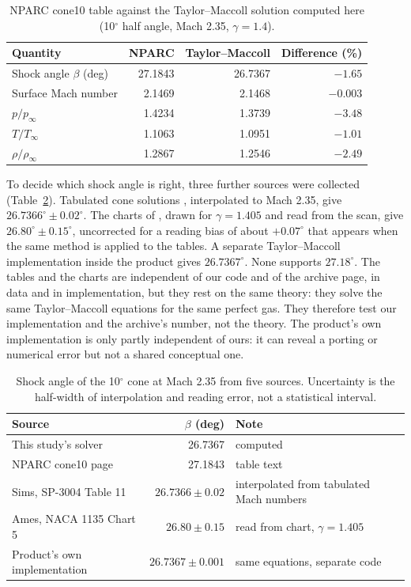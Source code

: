\documentclass[11pt,a4paper]{article}
\newcommand{\pinf}{p_\infty}
\begin{document}
\begin{table}[t]
\centering
\caption{NPARC cone10 table against the Taylor--Maccoll solution computed here (10$^\circ$ half angle, Mach 2.35, $\gamma=1.4$).}
\label{tab:cone10}
\small
\begin{tabular}{@{}lrrr@{}}
\toprule
Quantity & NPARC & Taylor--Maccoll & Difference (\%) \\
\midrule
Shock angle $\beta$ (deg) & 27.1843 & 26.7367 & $-1.65$ \\
Surface Mach number & 2.1469 & 2.1468 & $-0.003$ \\
$p/\pinf$ & 1.4234 & 1.3739 & $-3.48$ \\
$T/T_\infty$ & 1.1063 & 1.0951 & $-1.01$ \\
$\rho/\rho_\infty$ & 1.2867 & 1.2546 & $-2.49$ \\
\bottomrule
\end{tabular}
\end{table}

To decide which shock angle is right, three further sources were collected (Table~\ref{tab:beta}).
Tabulated cone solutions \citep{sims1964}, interpolated to Mach 2.35, give $26.7366^\circ\pm0.02^\circ$.
The charts of \citet{ames1953}, drawn for $\gamma=1.405$ and read from the scan, give $26.80^\circ\pm0.15^\circ$,
uncorrected for a reading bias of about $+0.07^\circ$ that appears when the same method is applied to the tables.
A separate Taylor--Maccoll implementation inside the product gives $26.7367^\circ$.
None supports $27.18^\circ$.
The tables and the charts are independent of our code and of the archive page, in data and in implementation, but
they rest on the same theory: they solve the same Taylor--Maccoll equations for the same perfect gas.
They therefore test our implementation and the archive's number, not the theory.
The product's own implementation is only partly independent of ours: it can reveal a porting or numerical
error but not a shared conceptual one.

\begin{table}[t]
\centering
\caption{Shock angle of the 10$^\circ$ cone at Mach 2.35 from five sources. Uncertainty is the half-width of interpolation and reading error, not a statistical interval.}
\label{tab:beta}
\small
\begin{tabular}{@{}lrl@{}}
\toprule
Source & $\beta$ (deg) & Note \\
\midrule
This study's solver & 26.7367 & computed \\
NPARC cone10 page \citep{nparc_cone10} & 27.1843 & table text \\
Sims, SP-3004 Table 11 \citep{sims1964} & $26.7366\pm0.02$ & interpolated from tabulated Mach numbers \\
Ames, NACA 1135 Chart 5 \citep{ames1953} & $26.80\pm0.15$ & read from chart, $\gamma=1.405$ \\
Product's own implementation & $26.7367\pm0.001$ & same equations, separate code \\
\bottomrule
\end{tabular}
\end{table}
\end{document}
